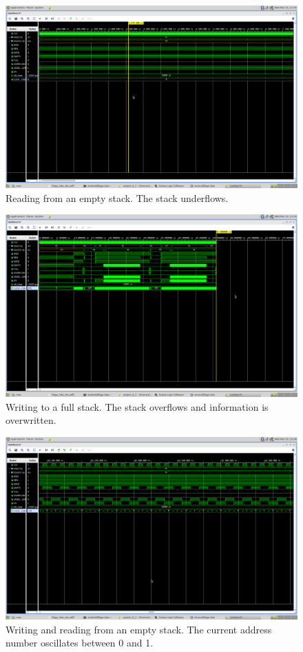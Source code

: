 \begin{figure}
    \includegraphics[width=.9\textwidth]{L8/E2/underflow.png}
    \caption{Reading from an empty stack. The stack underflows.}
    \label{pic: reading from an empty stack}
\end{figure}

\begin{figure}
    \includegraphics[width=.9\textwidth]{L8/E2/full.png}
    \caption{Writing to a full stack. The stack overflows and information is overwritten.}
    \label{pic: writing to a full stack}
\end{figure}

\begin{figure}
    \includegraphics[width=.9\textwidth]{L8/E2/sim_read_write_underflow_empty.png}
    \caption{Writing and reading from an empty stack. The current address number oscillates between 0 and 1.}
    \label{pic: w and r from e stack}
\end{figure}

